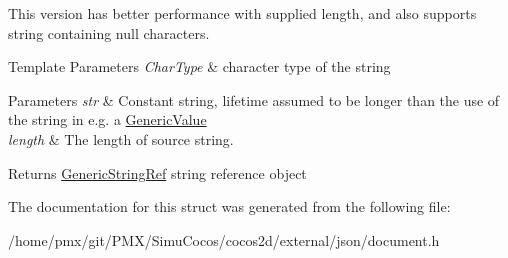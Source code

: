 This version has better performance with supplied length, and also supports string containing null characters.


\begin{DoxyTemplParams}{Template Parameters}
{\em Char\+Type} & character type of the string \\
\hline
\end{DoxyTemplParams}

\begin{DoxyParams}{Parameters}
{\em str} & Constant string, lifetime assumed to be longer than the use of the string in e.\+g. a \hyperlink{classGenericValue}{Generic\+Value} \\
\hline
{\em length} & The length of source string. \\
\hline
\end{DoxyParams}
\begin{DoxyReturn}{Returns}
\hyperlink{structGenericStringRef}{Generic\+String\+Ref} string reference object 
\end{DoxyReturn}


The documentation for this struct was generated from the following file\+:\begin{DoxyCompactItemize}
\item 
/home/pmx/git/\+P\+M\+X/\+Simu\+Cocos/cocos2d/external/json/document.\+h\end{DoxyCompactItemize}

